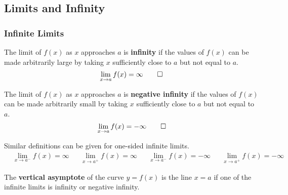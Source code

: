 \subsection{Limits and Infinity}
\subsubsection{Infinite Limits}
\begin{definition}
    The limit of \(f(x)\) as \(x\) approaches \(a\) is \textbf{infinity} if
    the values of \(f(x)\) can be made arbitrarily large by taking \(x\)
    sufficiently close to \(a\) but not equal to \(a\).
    \[\lim_{x\to a}f(x)=\infty\qedhere\]
\end{definition}
\begin{definition}
    The limit of \(f(x)\) as \(x\) approaches \(a\) is \textbf{negative infinity}
    if the values of \(f(x)\) can be made arbitrarily small by taking \(x\)
    sufficiently close to \(a\) but not equal to \(a\).
    \[\lim_{x\to a}f(x)=-\infty\qedhere\]
\end{definition}
Similar definitions can be given for one-sided infinite limits.
\begin{align*}
    &\lim_{x\to a^-}f(x)=\infty&&\lim_{x\to a^+}f(x)=\infty&
    &\lim_{x\to a^-}f(x)=-\infty&&\lim_{x\to a^+}f(x)=-\infty&
\end{align*}
\begin{definition}
    The \textbf{vertical asymptote} of the curve \(y=f(x)\) is the line \(x=a\)
    if one of the infinite limits is infinity or negative infinity.
\end{definition}

